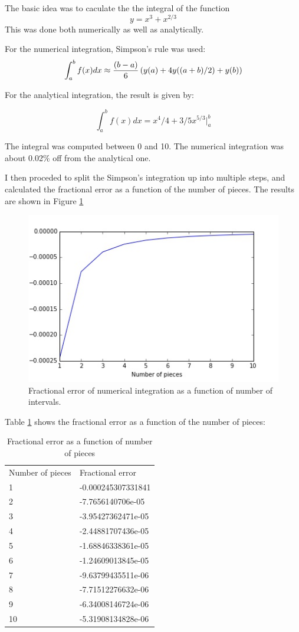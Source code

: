\documentclass{article}
\begin{document}
The basic idea was to caculate the the integral of the function
$$y = x^3 + x^{2/3}$$
This was done both numerically as well as analytically.

For the numerical integration, Simpson's rule was used:
$$\int_a^b f(x) dx \approx {(b-a)\over 6} \left(y(a) + 4 y((a+b)/2) + y(b)\right)$$

For the analytical integration, the result is given by:

$$\int_a^b f(x) dx = x^4/4 + 3/5 x^{5/3} |_a^b$$

The integral was computed between 0 and 10. The numerical integration was
about 0.02\% off from the analytical one.

I then proceded to split the Simpson's integration up into multiple steps, 
and calculated the fractional error as a function of the number of pieces.
The results are shown in Figure \ref{fig:simp}

\begin{figure}
\includegraphics[width=\textwidth]{../q3/simp.jpg}
\caption{Fractional error of numerical integration as a function of
number of intervals.}
\label{fig:simp}
\end{figure}

Table \ref{tab:simp} shows the fractional error as a function of the number
of pieces:

\begin{table}
\begin{tabular}{ll}
Number of pieces & Fractional error \\
1 & -0.000245307331841 \\
2 & -7.7656140706e-05 \\
3 & -3.95427362471e-05 \\
4 & -2.44881707436e-05 \\
5 & -1.68846338361e-05 \\
6 & -1.24609013845e-05 \\
7 & -9.63799435511e-06 \\
8 & -7.71512276632e-06 \\
9 & -6.34008146724e-06 \\
10 & -5.31908134828e-06 \\
\end{tabular}
\caption{Fractional error as a function of number of pieces}
\label{tab:simp}
\end{table}
\end{document}
